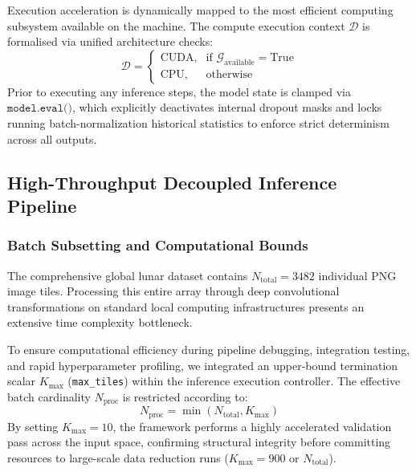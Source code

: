 \documentclass{aa}
\begin{document}
Execution acceleration is dynamically mapped to the most efficient computing subsystem available on the machine. The compute execution context $\mathcal{D}$ is formalised via unified architecture checks:
\begin{equation*}
\mathcal{D} = \begin{cases}
\text{CUDA}, & \text{if } \mathcal{G}_{\text{available}} = \text{True} \\
\text{CPU}, & \text{otherwise}
\end{cases}
\end{equation*}
Prior to executing any inference steps, the model state is clamped via $\texttt{model.eval()}$, which explicitly deactivates internal dropout masks and locks running batch-normalization historical statistics to enforce strict determinism across all outputs.

\subsection{High-Throughput Decoupled Inference Pipeline}
\subsubsection{Batch Subsetting and Computational Bounds}
The comprehensive global lunar dataset contains $N_{\text{total}} = 3482$ individual PNG image tiles. Processing this entire array through deep convolutional transformations on standard local computing infrastructures presents an extensive time complexity bottleneck.

To ensure computational efficiency during pipeline debugging, integration testing, and rapid hyperparameter profiling, we integrated an upper-bound termination scalar $K_{\text{max}}$ (\texttt{max\_tiles}) within the inference execution controller. The effective batch cardinality $N_{\text{proc}}$ is restricted according to:
\begin{equation*}
N_{\text{proc}} = \min(N_{\text{total}}, K_{\text{max}})
\end{equation*}
By setting $K_{\text{max}} = 10$, the framework performs a highly accelerated validation pass across the input space, confirming structural integrity before committing resources to large-scale data reduction runs ($K_{\text{max}} = 900$ or $N_{\text{total}}$).
\end{document}
